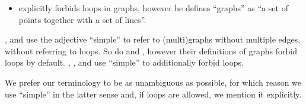 \begin{remark}
\begin{itemize}
    \item \Textcite[377]{Knuth1997ArtVol1} explicitly forbids loops in graphs, however he defines \enquote{graphs} as \enquote{a set of points together with a set of lines}.
  \end{itemize}

  \Textcite[def. 1.1.2]{Knauer2019AlgebraicGraphTheory}, \textcite[571]{Stanley2012EnumerativeCombinatoricsVol1} and \textcite[def. 10.1.1]{Rosen2019DiscreteMathematics} use the adjective \enquote{simple} to refer to (multi)graphs without multiple edges, without referring to loops. So do \textcite[2]{Diestel2017GraphTheory} and \textcite[22]{Bollobás1998ModernGraphTheory}, however their definitions of graphs forbid loops by default. \Textcite[22]{GondranMinoux1984GraphsAndAlgorithms}, \textcite[191]{Erickson2019Algorithms}, \textcite[17]{ЕмеличевИПр1990ТеорияГрафов} and \textcite[12]{Мирчев2001Графи} use \enquote{simple} to additionally forbid loops.

  We prefer our terminology to be as unambiguous as possible, for which reason we use \enquote{simple} in the latter sense and, if loops are allowed, we mention it explicitly.
\end{remark}

